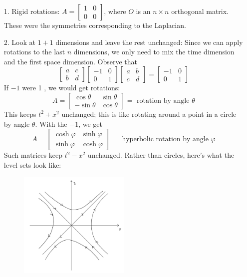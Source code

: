\begin{itemize}
    \item[1.] Rigid rotations: $A=\left[\begin{array}{ll}1 & 0 \\ 0 & 0\end{array}\right]$, where $O$ is an $n \times n$ orthogonal matrix. These were the symmetries corresponding to the Laplacian.
    \item[2.] Look at $1+1$ dimensions and leave the rest unchanged: Since we can apply rotations to the last $n$ dimensions, we only need to mix the time dimension and the first space dimension. Observe that
    $$
    \left[\begin{array}{ll}
    a & c \\
    b & d
    \end{array}\right]\left[\begin{array}{cc}
    -1 & 0 \\
    0 & 1
    \end{array}\right]\left[\begin{array}{ll}
    a & b \\
    c & d
    \end{array}\right]=\left[\begin{array}{cc}
    -1 & 0 \\
    0 & 1
    \end{array}\right]
    $$
    If $-1$ were 1 , we would get rotations:
    $$
    A=\left[\begin{array}{cc}
    \cos \theta & \sin \theta \\
    -\sin \theta & \cos \theta
    \end{array}\right]=\text { rotation by angle } \theta
    $$
    This keeps $t^{2}+x^{2}$ unchanged; this is like rotating around a point in a circle by angle $\theta$.
    With the $-1$, we get
$$
A=\left[\begin{array}{cc}
\cosh \varphi & \sinh \varphi \\
\sinh \varphi & \cosh \varphi
\end{array}\right]=\text { hyperbolic rotation by angle } \varphi
$$
Such matrices keep $t^{2}-x^{2}$ unchanged. Rather than circles, here's what the level sets look like:
\begin{figure}[H]
    \centering
    \includegraphics[width=0.5\textwidth]{pics/20-2.png}

\end{figure}
\end{itemize}
